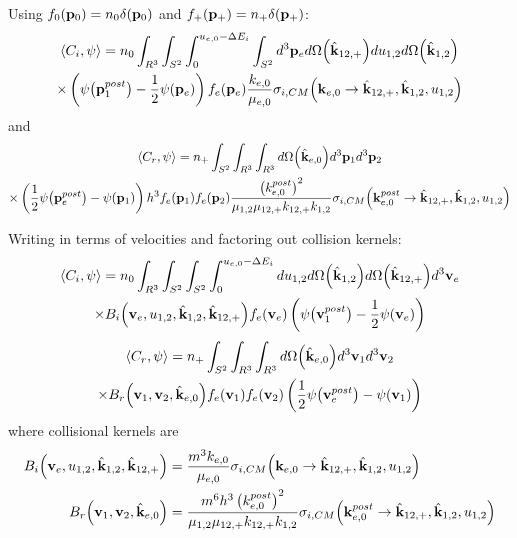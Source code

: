 \documentclass{article}[draft]
\begin{document}
Using $f_0\of{\vect{p}_0} = n_0 \delta\of{\vect{p}_0}$ and $f_+\of{\vect{p}_+} = n_+ \delta\of{\vect{p}_+}$:
\begin{multline*}
\left< C_i, \psi \right> 
= 
n_0
\int_{R^3} 
\int_{S^2} \int_{0}^{u_{e,0} - \Delta E_i} \int_{S^2} 
d^3 \vect{p}_e
d\Omega\of{\hat{\vect{k}}_{12,+}} 
d u_{1,2} d\Omega\of{\hat{\vect{k}}_{1,2}}
\\
\times
\left( \psi\of{\vect{p}_1^{post}}  
- \frac12 \psi\of{\vect{p}_e} \right) f_e\of{\vect{p}_e} 
\frac{ k_{e,0} }
{ \mu_{e,0} }
\sigma_{i,CM}\of{\vect{k}_{e,0} \rightarrow \hat{\vect{k}}_{12,+}, \hat{\vect{k}}_{1,2}, u_{1,2}}
\end{multline*}
and
\begin{multline*}
\left< C_r, \psi \right>  =
n_+
\int_{S^2} 
\int_{R^3} \int_{R^3} 
d \Omega\of{\hat{\vect{k}}_{e,0}}
d^3 \vect{p}_1 d^3 \vect{p}_2 
\\
\times
\left( \frac12 \psi\of{\vect{p}_e^{post}}
- \psi\of{\vect{p}_1} \right) h^3 f_e\of{\vect{p}_1}  f_e\of{\vect{p}_2} 
\frac{ \left( k_{e,0}^{post} \right)^2 }
{ \mu_{1,2} \mu_{12,+} k_{12,+} k_{1,2} }
\sigma_{i,CM}\of{\vect{k}_{e,0}^{post} \rightarrow \hat{\vect{k}}_{12,+}, \hat{\vect{k}}_{1,2}, u_{1,2}}
\end{multline*}

Writing in terms of velocities and factoring out collision kernels:
\begin{multline*}
\left< C_i, \psi \right> 
= 
n_0
\int_{R^3} 
\int_{S^2} \int_{S^2} \int_{0}^{u_{e,0} - \Delta E_i} 
d u_{1,2} d\Omega\of{\hat{\vect{k}}_{1,2}} d\Omega\of{\hat{\vect{k}}_{12,+}} d^3 \vect{v}_e
\\
\times B_i\of{\vect{v}_e, u_{1,2}, \hat{\vect{k}}_{1,2}, \hat{\vect{k}}_{12,+}} f_e\of{\vect{v}_e} 
\left( \psi\of{\vect{v}_1^{post}}  
- \frac12 \psi\of{\vect{v}_e} \right)
\end{multline*}
\begin{multline*}
\left< C_r, \psi \right>  =
n_+
\int_{S^2} 
\int_{R^3} \int_{R^3} 
d \Omega\of{\hat{\vect{k}}_{e,0}}
d^3 \vect{v}_1 d^3 \vect{v}_2 
\\
\times B_r\of{\vect{v}_1, \vect{v}_2, \hat{\vect{k}}_{e,0}}
f_e\of{\vect{v}_1}  f_e\of{\vect{v}_2} 
\left( \frac12 \psi\of{\vect{v}_e^{post}}
- \psi\of{\vect{v}_1} \right)
\end{multline*}
where collisional kernels are
\begin{align*}
B_i\of{\vect{v}_e, u_{1,2}, \hat{\vect{k}}_{1,2}, \hat{\vect{k}}_{12,+}}
&=
\frac{ m^3 k_{e,0} }
{ \mu_{e,0} }
\sigma_{i,CM}\of{\vect{k}_{e,0} \rightarrow \hat{\vect{k}}_{12,+}, \hat{\vect{k}}_{1,2}, u_{1,2}}
\\
B_r\of{\vect{v}_1, \vect{v}_2, \hat{\vect{k}}_{e,0}} &=
\frac{ m^6 h^3 \left( k_{e,0}^{post} \right)^2 }
{ \mu_{1,2} \mu_{12,+} k_{12,+} k_{1,2} }
\sigma_{i,CM}\of{\vect{k}_{e,0}^{post} \rightarrow \hat{\vect{k}}_{12,+}, \hat{\vect{k}}_{1,2}, u_{1,2}}
\end{align*}
\end{document}
